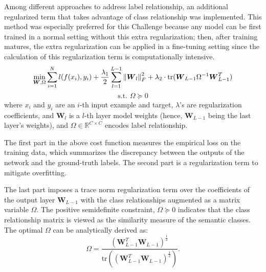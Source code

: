 \documentclass[runningheads]{llncs}
\newcommand\norm[1]{\left\lVert#1\right\rVert}
\begin{document}
Among different approaches to address label relationship, an additional regularized term that takes advantage of class relationship \cite{jiang2018} was implemented.
This method was especially preferred for this Challenge because any model can be first trained in a normal setting without this extra regularization; then, after training matures, the extra regularization can be applied in a fine-tuning setting since the calculation of this regularization term is computationally intensive.
\begin{equation}
        \min_{\boldsymbol{W}, \Omega} \sum_{i=1}^{N} l(f(x_i), y_i) + \frac{\lambda_1}{2} \sum_{l=1}^{L-1} \norm{ \boldsymbol{W}_l }_F^2 + \lambda_2 \cdot \textrm{tr}( \boldsymbol{W}_{L-1} \Omega^{-1} \boldsymbol{W}_{L-1}^T) \\
\end{equation}
\[
        \textrm{s.t. } \Omega \succeq 0
\]
where $x_i$ and $y_i$ are an $i$-th input example and target, $\lambda$'s are regularization coefficients, and $\boldsymbol{W}_l$ is a $l$-th layer model weights (hence, $\boldsymbol{W}_{L-1}$ being the last layer's weights), and $\Omega \in \mathbb{R}^{C \times C}$ encodes label relationship.

The first part in the above cost function measures the empirical loss on the training data, which summarizes the discrepancy between the outputs of the network and the ground-truth labels.
The second part is a regularization term to mitigate overfitting.

The last part imposes a trace norm regularization term over the coefficients of the output layer $\boldsymbol{W}_{L-1}$ with the class relationships augmented as a matrix variable $\Omega$.
The positive semidefinite constraint, $\Omega \succeq 0$ indicates that the class relationship matrix is viewed as the similarity measure of the semantic classes.
The optimal $\Omega$ can be analytically derived as:
\begin{equation}
        \Omega = \frac
        { ( \boldsymbol{W}_{L-1}^T \boldsymbol{W}_{L-1} )^\frac{1}{2}  }
        { \textrm{tr} (( \boldsymbol{W}_{L-1}^T \boldsymbol{W}_{L-1} )^\frac{1}{2} )  }.
\end{equation}

\end{document}
